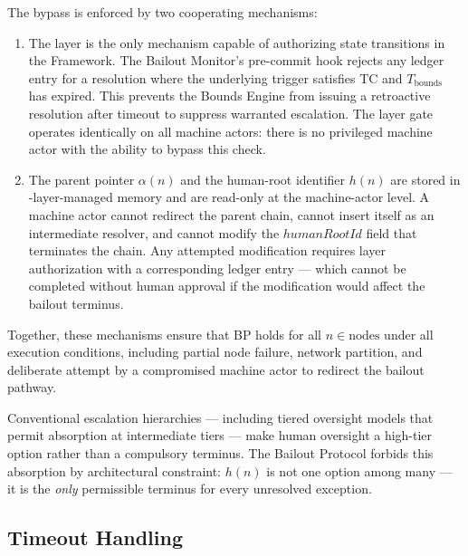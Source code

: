 The bypass is enforced by two cooperating mechanisms:

\begin{enumerate}
    \item[\textbf{Fact Layer gate.}] The \fact{} layer is the only mechanism capable of authorizing state transitions in the \bxthree{} Framework. The Bailout Monitor's pre-commit hook rejects any ledger entry for a resolution where the underlying trigger satisfies TC and $T_{\text{bounds}}$ has expired. This prevents the Bounds Engine from issuing a retroactive resolution after timeout to suppress warranted escalation. The \fact{} layer gate operates identically on all machine actors: there is no privileged machine actor with the ability to bypass this check.

    \item[\textbf{Immutable parent-pointer and human-root architecture.}] The parent pointer $\alpha(n)$ and the human-root identifier $h(n)$ are stored in \fact-layer-managed memory and are read-only at the machine-actor level. A machine actor cannot redirect the parent chain, cannot insert itself as an intermediate resolver, and cannot modify the $humanRootId$ field that terminates the chain. Any attempted modification requires \purpose{} layer authorization with a corresponding ledger entry — which cannot be completed without human approval if the modification would affect the bailout terminus.
\end{enumerate}

Together, these mechanisms ensure that BP holds for all $n \in \text{nodes}$ under all execution conditions, including partial node failure, network partition, and deliberate attempt by a compromised machine actor to redirect the bailout pathway.

Conventional escalation hierarchies — including tiered oversight models that permit absorption at intermediate tiers — make human oversight a high-tier option rather than a compulsory terminus. The Bailout Protocol forbids this absorption by architectural constraint: $h(n)$ is not one option among many — it is the \emph{only} permissible terminus for every unresolved exception.

\subsection{Timeout Handling}\label{sec:timeout-handling}

